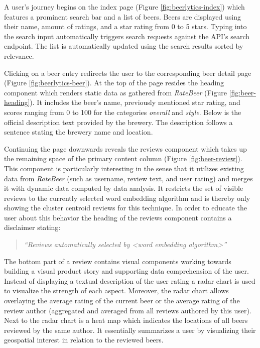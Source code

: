 A user's journey begins on the index page (Figure \ref{fig:beerlytics-index}) which features a prominent search bar and a list of beers.
Beers are displayed using their name, amount of ratings, and a star rating from 0 to 5 stars.
Typing into the search input automatically triggers search requests against the API's search endpoint.
The list is automatically updated using the search results sorted by relevance.

Clicking on a beer entry redirects the user to the corresponding beer detail page (Figure \ref{fig:beerlytics-beer}).
At the top of the page resides the heading component which renders static data as gathered from \textit{RateBeer} (Figure \ref{fig:beer-heading}).
It includes the beer's name, previously mentioned star rating, and scores ranging from 0 to 100 for the categories \textit{overall} and \textit{style}.
Below is the official description text provided by the brewery.
The description follows a sentence stating the brewery name and location.

Continuing the page downwards reveals the reviews component which takes up the remaining space of the primary content column (Figure \ref{fig:beer-review}).
This component is particularly interesting in the sense that it utilizes existing data from \textit{RateBeer} (such as username, review text, and user rating) and merges it with dynamic data computed by data analysis.
It restricts the set of visible reviews to the currently selected word embedding algorithm and is thereby only showing the cluster centroid reviews for this technique.
In order to educate the user about this behavior the heading of the reviews component contains a disclaimer stating:
\begin{quote}
\emph{``Reviews automatically selected by <word embedding algorithm>''}
\end{quote}
The bottom part of a review contains visual components working towards building a visual product story and supporting data comprehension of the user.
Instead of displaying a textual description of the user rating a radar chart is used to visualize the strength of each aspect.
Moreover, the radar chart allows overlaying the average rating of the current beer or the average rating of the review author (aggregated and averaged from all reviews authored by this user).
Next to the radar chart is a heat map which indicates the locations of all beers reviewed by the same author.
It essentially summarizes a user by visualizing their geospatial interest in relation to the reviewed beers.

